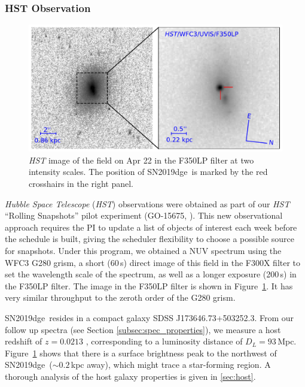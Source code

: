 \documentclass[twocolumn]{aastex63}
\newcommand{\name}{SN2019dge}
\begin{document}
\subsubsection{HST Observation}
\begin{figure}
	\centering
	\includegraphics[width=\columnwidth]{figures/offset.pdf}
	\caption{\textit{HST} image of the field on Apr 22 in the F350LP filter at two intensity scales. The 
	position of \name\ is marked by the red crosshairs in the right panel.
		\label{fig:offset}}
\end{figure}
\textit{Hubble Space Telescope} (\textit{HST}) observations were obtained as part of our \textit{HST}
``Rolling Snapshots'' pilot experiment (GO-15675, \citealt{Fruchter2018}). This new observational 
approach requires the PI to update a list of objects of interest each week before the schedule is built, 
giving the scheduler flexibility to choose a possible source for snapshots. Under this program, we 
obtained a NUV spectrum using the WFC3 G280 grism, a short (60\,s) direct image of this field in the 
F300X filter to set the wavelength scale of the spectrum, as well as a longer exposure (200\,s) in the 
F350LP filter. The image in the F350LP filter is shown in Figure~\ref{fig:offset}. It has very similar 
throughput to the zeroth order of the G280 grism. 

\name\ resides in a compact galaxy SDSS J173646.73+503252.3. From our follow up spectra (see 
Section \ref{subsec:spec_properties}), we measure a host redshift of $z=0.0213$ , corresponding to a 
luminosity distance of $D_L = 93$\,Mpc. Figure~\ref{fig:offset} shows that there is a surface brightness 
peak to the northwest of \name\ ($\sim0.2$\,kpc away), which might trace a star-forming region. 
{\color{red}A thorough analysis of the host galaxy properties is given in \ref{sec:host}.}
\end{document}

